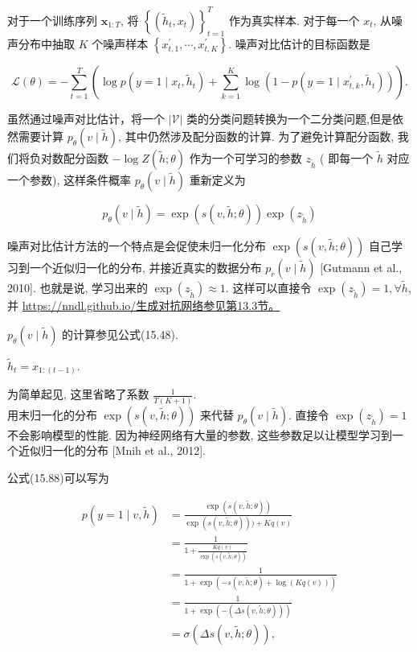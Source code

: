 \documentclass[10pt]{article}
\begin{document}
对于一个训练序列 $\boldsymbol{x}_{1: T}$, 将 $\left\{\left(\tilde{h}_{t}, x_{t}\right)\right\}_{t=1}^{T}$ 作为真实样本. 对于每一个 $x_{t}$, 从噪声分布中抽取 $K$ 个噪声样本 $\left\{x_{t, 1}^{\prime}, \cdots, x_{t, K}^{\prime}\right\}$. 噪声对比估计的目标函数是


\begin{equation*}
\mathcal{L}(\theta)=-\sum_{t=1}^{T}\left(\log p\left(y=1 \mid x_{t}, \tilde{h}_{t}\right)+\sum_{k=1}^{K} \log \left(1-p\left(y=1 \mid x_{t, k}^{\prime}, \tilde{h}_{t}\right)\right)\right) . \tag{15.89}
\end{equation*}


虽然通过噪声对比估计，将一个 $|\mathcal{V}|$ 类的分类问题转换为一个二分类问题,但是依然需要计算 $p_{\theta}(v \mid \tilde{h})$, 其中仍然涉及配分函数的计算. 为了避免计算配分函数, 我们将负对数配分函数 $-\log Z(\tilde{h} ; \theta)$ 作为一个可学习的参数 $z_{\tilde{h}}$ ( 即每一个 $\tilde{h}$ 对应一个参数), 这样条件概率 $p_{\theta}(v \mid \tilde{h})$ 重新定义为


\begin{equation*}
p_{\theta}(v \mid \tilde{h})=\exp (s(v, \tilde{h} ; \theta)) \exp \left(z_{\tilde{h}}\right) \tag{15.90}
\end{equation*}


噪声对比估计方法的一个特点是会促使未归一化分布 $\exp (s(v, \tilde{h} ; \theta))$ 自己学习到一个近似归一化的分布, 并接近真实的数据分布 $p_{r}(v \mid \tilde{h})$ [Gutmann et al., 2010]. 也就是说, 学习出来的 $\exp \left(z_{\tilde{h}}\right) \approx 1$. 这样可以直接令 $\exp \left(z_{\tilde{h}}\right)=1, \forall \tilde{h}$, 并 \href{https://nndl.github.io/%E7%94%9F%E6%88%90%E5%AF%B9%E6%8A%97%E7%BD%91%E7%BB%9C%E5%8F%82%E8%A7%81%E7%AC%AC13.3%E8%8A%82%E3%80%82}{https://nndl.github.io/生成对抗网络参见第13.3节。}

$p_{\theta}(v \mid \tilde{h})$ 的计算参见公式(15.48).

$\tilde{h}_{t}=x_{1:(t-1)}$.

为简单起见, 这里省略了系数 $\frac{1}{T(K+1)}$.\\
用末归一化的分布 $\exp (s(v, \tilde{h} ; \theta))$ 来代替 $p_{\theta}(v \mid \tilde{h})$. 直接令 $\exp \left(z_{\tilde{h}}\right)=1$ 不会影响模型的性能. 因为神经网络有大量的参数, 这些参数足以让模型学习到一个近似归一化的分布 [Mnih et al., 2012].

公式(15.88)可以写为


\begin{align*}
p(y=1 \mid v, \tilde{h}) & =\frac{\exp (s(v, \tilde{h} ; \theta))}{\exp (s(v, \tilde{h} ; \theta)))+K q(v)}  \tag{15.91}\\
& =\frac{1}{1+\frac{K q(v)}{\exp (s(v, \tilde{h} ; \theta))}}  \tag{15.92}\\
& =\frac{1}{1+\exp (-s(v, \tilde{h} ; \theta)+\log (K q(v)))}  \tag{15.93}\\
& =\frac{1}{1+\exp (-(\Delta s(v, \tilde{h} ; \theta)))}  \tag{15.94}\\
& =\sigma(\Delta s(v, \tilde{h} ; \theta)), \tag{15.95}
\end{align*}
\end{document}

